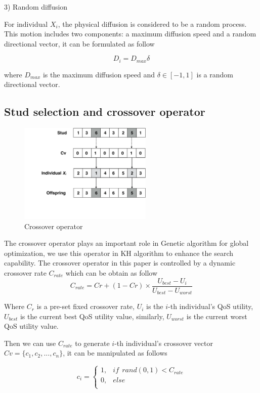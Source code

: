 \documentclass[10pt,journal,compsoc]{IEEEtran}
\begin{document}
3) Random diffusion

For individual $X_i$, the physical diffusion is considered to be a random process. This motion includes two components: a maximum diffusion speed and a random directional vector, it can be formulated as follow

\begin{equation}
D_i = D_{max}\delta
\end{equation}

where $D_{max}$ is the maximum diffusion speed and $\delta \in [-1, 1]$ is a random directional vector.

\subsection{Stud selection and crossover operator}

\begin{figure}[!t]
\centering
\includegraphics[width=2.5in]{./img/pic5.pdf}
\caption{Crossover operator}
\label{Crossover operator}
\end{figure}


The crossover operator plays an important role in Genetic algorithm for global optimization, we use this operator in KH algorithm to enhance the search capability. The crossover operator in this paper is controlled by a dynamic crossover rate $C_{rate}$ which can be obtain as follow
\begin{equation}
C_{rate} = Cr + (1-Cr) \times \frac{U_{best}-U_{i}}{U_{best}-U_{worst}}
\end{equation}

Where $C_r$ is a pre-set fixed crossover rate, $U_{i}$ is the $i$-th individual's QoS utility, $U_{best}$ is the current best QoS utility value, similarly, $U_{worst}$ is the current worst QoS utility value. 

Then we can use $C_{rate}$ to generate $i$-th individual's crossover vector $Cv = \{c_{1},c_{2},...,c_{n}\}$, it can be manipulated as follows

\begin{equation}
c_{i}=
\begin{cases}
1,& if \ \ rand(0,1) < C_{rate}\\
0,& else\\
\end{cases}
\end{equation}
\end{document}
